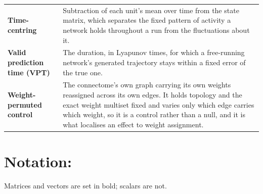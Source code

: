 \begin{longtable}{>{\raggedright\arraybackslash}p{3.4cm}p{\dimexpr\linewidth-3.4cm-4\tabcolsep\relax}}
    \textbf{Time-centring} & Subtraction of each unit's mean over time from the state matrix, which separates the fixed pattern of activity a network holds throughout a run from the fluctuations about it. \\

    \textbf{Valid prediction time (VPT)} & The duration, in Lyapunov times, for which a free-running network's generated trajectory stays within a fixed error of the true one. \\

    \textbf{Weight-permuted control} & The connectome's own graph carrying its own weights reassigned across its own edges. It holds topology and the exact weight multiset fixed and varies only which edge carries which weight, so it is a control rather than a null, and it is what localises an effect to weight assignment. \\

    \bottomrule
\end{longtable}




\newpage
\section*{Notation:}
\bigskip

Matrices and vectors are set in bold; scalars are not.

